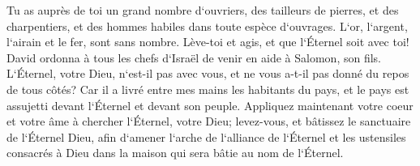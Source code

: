 \verse Tu as auprès de toi un grand nombre d`ouvriers, des tailleurs de pierres, et des charpentiers, et des hommes habiles dans toute espèce d`ouvrages. 
\verse L`or, l`argent, l`airain et le fer, sont sans nombre. Lève-toi et agis, et que l`Éternel soit avec toi! 
\verse David ordonna à tous les chefs d`Israël de venir en aide à Salomon, son fils. 
\verse L`Éternel, votre Dieu, n`est-il pas avec vous, et ne vous a-t-il pas donné du repos de tous côtés? Car il a livré entre mes mains les habitants du pays, et le pays est assujetti devant l`Éternel et devant son peuple. 
\verse Appliquez maintenant votre coeur et votre âme à chercher l`Éternel, votre Dieu; levez-vous, et bâtissez le sanctuaire de l`Éternel Dieu, afin d`amener l`arche de l`alliance de l`Éternel et les ustensiles consacrés à Dieu dans la maison qui sera bâtie au nom de l`Éternel. 

\chapter{}

